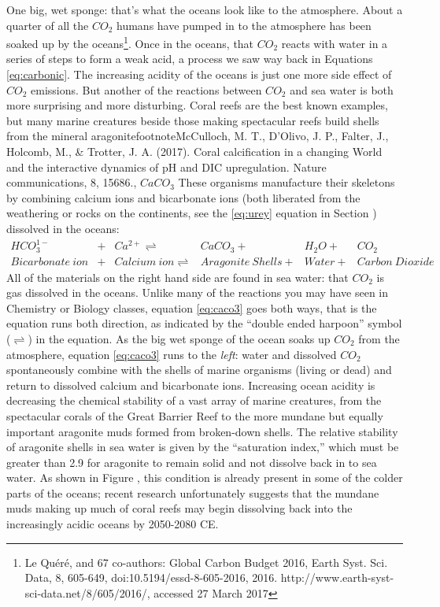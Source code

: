 One big, wet sponge: that's what the oceans look like to the atmosphere. About a quarter of all the $CO_2$ humans have pumped in to the atmosphere has been soaked up by the oceans\footnote{ Le Qu\'er\'e, and 67 co-authors: Global Carbon Budget 2016, Earth Syst. Sci. Data, 8, 605-649, doi:10.5194/essd-8-605-2016, 2016. http://www.earth-syst-sci-data.net/8/605/2016/, accessed 27 March 2017}. Once in the oceans, that $CO_2$ reacts with water in a series of steps to form a weak acid, a process we saw way back in Equations \ref{eq:carbonic}. The increasing acidity of the oceans is just one more side effect of $CO_2$ emissions. But another of the reactions between $CO_2$ and sea water is both more surprising and more disturbing. Coral reefs are the best known examples, but many marine creatures beside those making spectacular reefs build shells from the mineral aragonite{footnote{McCulloch, M. T., D'Olivo, J. P., Falter, J., Holcomb, M., \& Trotter, J. A. (2017). Coral calcification in a changing World and the interactive dynamics of pH and DIC upregulation. Nature communications, 8, 15686.}, $CaCO_3$ These organisms manufacture their skeletons by combining calcium ions and bicarbonate ions (both liberated from the weathering or rocks on the continents, see the \ref{eq:urey} equation in Section \label{swrwl}) dissolved in the oceans: 
\begin{align} \label{eq:caco3}
	HCO_3^{1-} & + & Ca^{2+} \rightleftharpoons & CaCO_3 + & H_2O + & CO_2\\
	Bicarbonate \ ion & + & Calcium \ ion \rightleftharpoons & Aragonite \ Shells + & Water+ & Carbon \ Dioxide 
\end{align}
All of the materials on the right hand side are found in sea water: that $CO_2$ is gas dissolved in the oceans. Unlike many of the reactions you may have seen in Chemistry or Biology classes, equation \ref{eq:caco3} goes both ways, that is the equation runs both direction, as indicated by the ``double ended harpoon'' symbol ($\rightleftharpoons$) in the equation. As the big wet sponge of the ocean soaks up $CO_2$ from the atmosphere, equation \ref{eq:caco3} runs to the \emph{left}: water and dissolved $CO_2$ spontaneously combine with the shells of marine organisms (living or dead) and return to dissolved calcium and bicarbonate ions. Increasing ocean acidity is decreasing the chemical stability of a vast array of marine creatures, from the spectacular corals of the Great Barrier Reef to the more mundane but equally important aragonite muds formed from broken-down shells. The relative stability of aragonite shells in sea water is given by the ``saturation index,'' which must be greater than 2.9 for aragonite to remain solid and not dissolve back in to sea water. As shown in Figure \label{fig:arag_map}, this condition is already present in some of the colder parts of the oceans; recent research unfortunately suggests that the mundane muds making up much of coral reefs may begin dissolving back into the increasingly acidic oceans by 2050-2080 CE. \\
}

